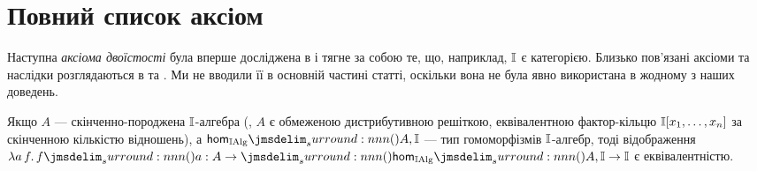 \documentclass[12pt]{article}
\newcommand{\textcite}{\cite}
\let\prn\DelimPrn
\begin{document}

\newpage
\section{Повний список аксіом}
\label{sec:axioms}

\intaxiom*
\crispidaxiom*
\intopaxiom*
\intdiscaxiom*
\intglobalaxiom*
\cubessepaxiom*
\twarraxiom*

Наступна \emph{аксіома двоїстості} була вперше досліджена в \textcite{blechschmidt:2023} і тягне за собою те,
що, наприклад, $\mathbb{I}$ є категорією. Близько пов'язані аксіоми та наслідки розглядаються в \textcite{pugh:2025}
та \textcite{cherubini:2023}. Ми не вводили її в основній частині статті, оскільки вона не була явно використана
в жодному з наших доведень.

\begin{axiom}
  Якщо $A$ --- скінченно-породжена $\mathbb{I}$-алгебра \textup(\ie{}, $A$ є обмеженою дистрибутивною решіткою,
еквівалентною фактор-кільцю $\mathbb{I}[x_1,\ldots,x_n]$ за скінченною кількістю відношень\textup),
а $\Hom[\Int\mathrm{Alg}]{A}{\Int}$ --- тип гомоморфізмів $\mathbb{I}$-алгебр, тоді відображення
$\lambda a\,f.\,f\prn{a} : A \to \prn{\Hom[\Int\mathrm{Alg}]{A}{\Int} \to \Int}$ є еквівалентністю.
\end{axiom}
\end{document}
